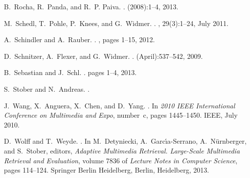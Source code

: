\documentclass{proc}
\begin{document}
\begin{thebibliography}{10}
B.~Rocha, R.~Panda, and R.~P. Paiva.
.
\newblock (2008):1--4, 2013.

M.~Schedl, T.~Pohle, P.~Knees, and G.~Widmer.
.
, 29(3):1--24, July
  2011.

A.~Schindler and A.~Rauber.
.
, pages 1--15, 2012.

D.~Schnitzer, A.~Flexer, and G.~Widmer.
.
\newblock (April):537--542, 2009.

B.~Sebastian and J.~Schl.
.
\newblock pages 1--4, 2013.

S.~Stober and N.~Andreas.
.

J.~Wang, X.~Anguera, X.~Chen, and D.~Yang.
.
\newblock In {\em 2010 IEEE International Conference on Multimedia and Expo},
  number~c, pages 1445--1450. IEEE, July 2010.

D.~Wolff and T.~Weyde.
.
\newblock In M.~Detyniecki, A.~Garc\'{\i}a-Serrano, A.~N\"{u}rnberger, and
  S.~Stober, editors, {\em Adaptive Multimedia Retrieval. Large-Scale
  Multimedia Retrieval and Evaluation}, volume 7836 of {\em Lecture Notes in
  Computer Science}, pages 114--124. Springer Berlin Heidelberg, Berlin,
  Heidelberg, 2013.

\end{thebibliography}

\bigskip
\end{document}
